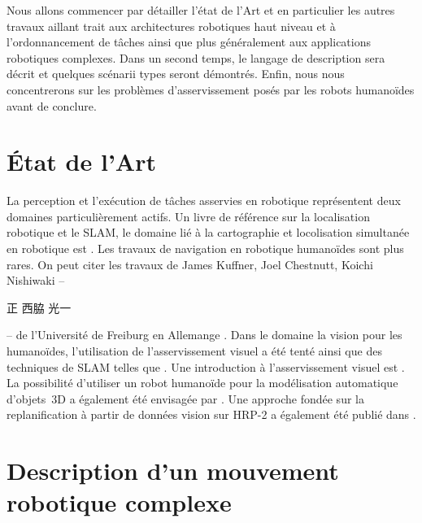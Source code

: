 Nous allons commencer par détailler l'état de l'Art et en particulier
les autres travaux aillant trait aux architectures robotiques haut
niveau et à l'ordonnancement de tâches ainsi que plus généralement aux
applications robotiques complexes. Dans un second temps, le langage de
description sera décrit et quelques scénarii types seront
démontrés. Enfin, nous nous concentrerons sur les problèmes
d'asservissement posés par les robots humanoïdes avant de conclure.


\section{État de l'Art}


La perception et l'exécution de tâches asservies en robotique
représentent deux domaines particulièrement actifs. Un livre de
référence sur la localisation robotique et le SLAM, le domaine lié à
la cartographie et locolisation simultanée en robotique est
\cite{05thrun}. Les travaux de navigation en robotique
humanoïdes sont plus rares. On peut citer les travaux de James
Kuffner, Joel Chestnutt, Koichi Nishiwaki -- \begin{CJK*}{UTF8}{min}正
  西脇 光一\end{CJK*} --
  \cite{05michel.humanoids,05ozawa.smc,03chestnutt.humanoids,02nishiwaki.rsj}
  de l'Université de Freiburg en Allemange
  \cite{10osswald.icra}. Dans le domaine la vision pour les
  humanoïdes, l'utilisation de l'asservissement visuel a été tenté
  \cite{10dune.iros} ainsi que des techniques de SLAM telles que
  \cite{06stasse.iros,09kwak.humanoids}. Une introduction à l'asservissement
  visuel est \cite{06chaumette.ram,07chaumette.ram}. La
  possibilité d'utiliser un robot humanoïde pour la modélisation
  automatique d'objets 3D a également été envisagée par
  \cite{09foisotte.icra,08stasse.ras}. Une approche fondée sur
  la replanification à partir de données vision sur HRP-2 a également
  été publié dans \cite{11dang.humanoids}.


\section{Description d'un mouvement robotique complexe}



